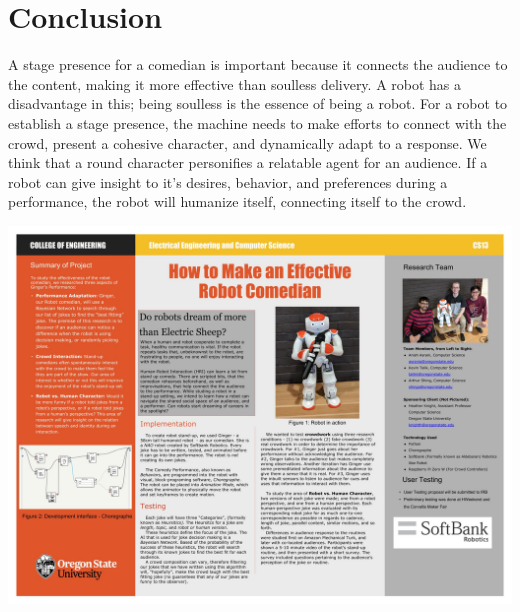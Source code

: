 \documentclass[onecolumn, draftclsnofoot,10pt, compsoc]{IEEEtran}
\begin{document}
\section{Conclusion}
A stage presence for a comedian is important because it connects the audience to the content, making it more effective than soulless delivery. A robot has a disadvantage in this; being soulless is the essence of being a robot. For a robot to establish a stage presence, the machine needs to make efforts to connect with the crowd, present a cohesive character, and dynamically adapt to a response. We think that a round character personifies a relatable agent for an audience. If a robot can give insight to it's desires, behavior, and preferences during a performance, the robot will humanize itself, connecting itself to the crowd.

\clearpage

  \includegraphics[width=\textwidth]{poster.jpg}
\end{document}
